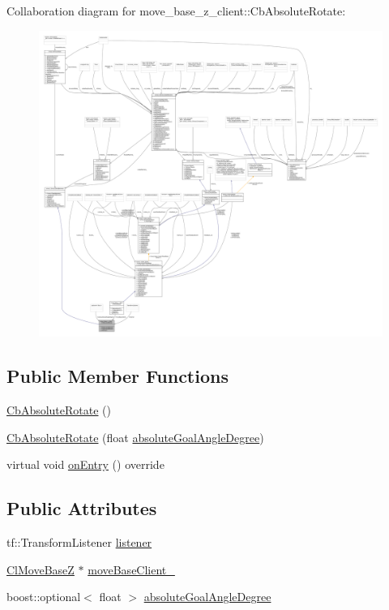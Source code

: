 Collaboration diagram for move\+\_\+base\+\_\+z\+\_\+client\+:\+:Cb\+Absolute\+Rotate\+:
\nopagebreak
\begin{figure}[H]
\begin{center}
\leavevmode
\includegraphics[width=350pt]{classmove__base__z__client_1_1CbAbsoluteRotate__coll__graph}
\end{center}
\end{figure}
\subsection*{Public Member Functions}
\begin{DoxyCompactItemize}
\item 
\hyperlink{classmove__base__z__client_1_1CbAbsoluteRotate_a9af55c847c2ad3f797c873eb394ed1e8}{Cb\+Absolute\+Rotate} ()
\item 
\hyperlink{classmove__base__z__client_1_1CbAbsoluteRotate_a249eeb852daaba2fef543737b64f0648}{Cb\+Absolute\+Rotate} (float \hyperlink{classmove__base__z__client_1_1CbAbsoluteRotate_a3732ce20b520f9df9408f849ff809a19}{absolute\+Goal\+Angle\+Degree})
\item 
virtual void \hyperlink{classmove__base__z__client_1_1CbAbsoluteRotate_ab5537a52d9ddb242be60e6f9e0b231af}{on\+Entry} () override
\end{DoxyCompactItemize}
\subsection*{Public Attributes}
\begin{DoxyCompactItemize}
\item 
tf\+::\+Transform\+Listener \hyperlink{classmove__base__z__client_1_1CbAbsoluteRotate_a78740c9a93398f6a41bc4e5171e5a581}{listener}
\item 
\hyperlink{classmove__base__z__client_1_1ClMoveBaseZ}{Cl\+Move\+BaseZ} $\ast$ \hyperlink{classmove__base__z__client_1_1CbAbsoluteRotate_a2a96d8ec86bb2802391b044da7f10daf}{move\+Base\+Client\+\_\+}
\item 
boost\+::optional$<$ float $>$ \hyperlink{classmove__base__z__client_1_1CbAbsoluteRotate_a3732ce20b520f9df9408f849ff809a19}{absolute\+Goal\+Angle\+Degree}
\end{DoxyCompactItemize}


